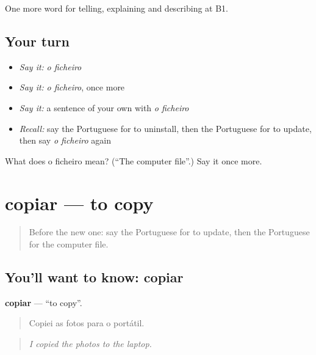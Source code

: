 \begin{grammarlens}[title={What you've built}]
One more word for telling, explaining and describing at B1.
\end{grammarlens}

\subsection*{Your turn}
\begin{itemize}
\raggedright
  \item \emph{Say it:} \emph{o ficheiro}
  \item \emph{Say it:} \emph{o ficheiro}, once more
  \item \emph{Say it:} a sentence of your own with \emph{o ficheiro}
  \item \emph{Recall:} say the Portuguese for to uninstall, then the Portuguese for to update, then say \emph{o ficheiro} again
\end{itemize}

\begin{tcolorbox}[breakable,colback=teal!4,colframe=teal!35!black,title={Before you move on}]
What does o ficheiro mean? (\textquotedblleft{}The computer file\textquotedblright{}.) Say it once more.
\end{tcolorbox}
\section[copiar]{copiar — to copy}

\label{lesson:PT-C398-copiar}



\begin{quote}
Before the new one: say the Portuguese for to update, then the Portuguese for the computer file.
\end{quote}

\subsection*{You'll want to know: copiar}
\textbf{copiar} — \textquotedblleft{}to copy\textquotedblright{}.

\begin{quote}
Copiei as fotos para o portátil.
\end{quote}

\begin{quote}
\emph{I copied the photos to the laptop.}
\end{quote}

